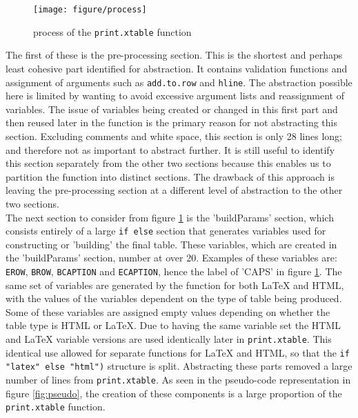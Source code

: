 \documentclass{memoir}\usepackage[]{graphicx}\usepackage[]{color}
\newenvironment{knitrout}{}{} %
\let\code=\texttt
\newcommand{\latex}{\LaTeX\xspace}
\begin{document}
\begin{figure}[H]
\vspace{-110pt}
\begin{knitrout}
\color{fgcolor}
\texttt{[image: figure/process]} 

\end{knitrout}
\vspace{-100pt}
\caption{process of the \code{print.xtable} function}\label{fig:process}
\end{figure}

The first of these is the pre-processing section. This is the shortest and perhaps least cohesive part identified for abstraction. It contains validation functions and assignment of arguments such as \code{add.to.row} and \code{hline}. The abstraction possible here is limited by wanting to avoid excessive argument lists and reassignment of variables. The issue of variables being created or changed in this first part and then reused later in the function is the primary reason for not abstracting this section. Excluding comments and white space, this section is only 28 lines long; and therefore not as important to abstract further. It is still useful to identify this section separately from the other two sections because this enables us to partition the function into distinct sections. The drawback of this approach is leaving the pre-processing section at a different level of abstraction to the other two sections.\\

The next section to consider from figure \ref{fig:process} is the 'buildParams' section, which consists entirely of a large \code{if else} section that generates variables used for constructing or 'building' the final table. These variables, which are created in the 'buildParams' section, number at over 20. Examples of these variables are: \code{EROW}, \code{BROW}, \code{BCAPTION} and \code{ECAPTION}, hence the label of 'CAPS' in figure \ref{fig:process}. The same set of variables are generated by the function for both \latex and HTML, with the values of the variables dependent on the type of table being produced.  Some of these variables are assigned empty values depending on whether the table type is HTML or \latex. Due to having the same variable set the HTML and \latex variable versions are used identically later in \code{print.xtable}. This identical use allowed for separate functions for \latex and HTML, so that the \code{if "latex" else "html")} structure is split. Abstracting these parts removed a large number of lines from \code{print.xtable}. As seen in the pseudo-code representation in figure \ref{fig:pseudo}, the creation of these components is a large proportion of the \code{print.xtable} function.\\
\end{document}
